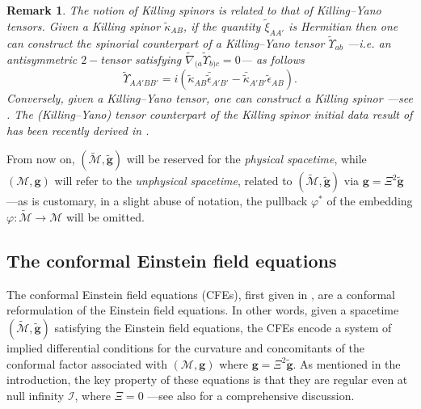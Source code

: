 \documentclass[10pt,a4paper]{article}
\theoremstyle{plain}
\newtheorem{remark}{Remark}
\def\bmg{{\bm g}}
\begin{document}
\begin{remark}
  \emph{ The notion of Killing spinors is related to that of
  Killing--Yano tensors. Given a Killing spinor $\tilde{\kappa}_{AB}$, if the quantity $\tilde{\xi}_{AA'}$ is
  Hermitian
  then
  one can construct the spinorial counterpart of a \emph{Killing--Yano
  tensor} $\tilde{\Upsilon}_{ab}$ ---i.e. an antisymmetric $2-$tensor
  satisfying $\tilde{\nabla}_{(a}\tilde{\Upsilon}_{b)c}=0$--- as
  follows
\[\tilde{\Upsilon}_{AA'BB'}=i(\tilde{\kappa}_{AB}\bar{\tilde{\epsilon}}_{A'B'}
-\bar{\tilde{\kappa}}_{A'B'}\tilde{\epsilon}_{AB}).\] 
Conversely,
given a Killing--Yano tensor, one can construct a Killing spinor
---see \cite{ValCol16,McLBer93,PenRin86}.  The (Killing--Yano) tensor
counterpart of the Killing spinor initial data result of \cite{GarVal08c}
has been recently derived in \cite{GarKha19a}.  }
\end{remark}
From now on, $(\tilde{\mathcal{M}},\tilde{\bmg})$ will be reserved for the \emph{physical spacetime},
while $(\mathcal{M},\bmg)$ will refer to the \emph{unphysical spacetime}, related to
$(\tilde{\mathcal{M}},\tilde{\bmg})$ via $\bmg=\Xi^2\tilde{\bmg}$ ---as is customary, in a slight abuse of notation, the pullback $\varphi^*$ of the
 embedding $\varphi:
\tilde{\mathcal{M}}\rightarrow\mathcal{M}$ will be omitted.



\subsection{The conformal Einstein field equations}
\label{Sec:CFEs}

 

The conformal Einstein field equations (CFEs), first given in \cite{Fri81a}, are a conformal
reformulation of the Einstein field equations. In other words, given a
spacetime $(\tilde{\mathcal{M}},\tilde{\bmg})$ satisfying the Einstein
field equations, the CFEs encode a system of implied differential conditions for the curvature and
concomitants of the conformal factor associated with
$(\mathcal{M},\bmg)$ where $\bmg=\Xi^2\tilde{\bmg}$. As mentioned in the introduction, the key property
of these equations is that they are regular even at null infinity
$\mathscr{I}$, where $\Xi=0$ ---see also \cite{CFEbook} for a
comprehensive discussion.


\medskip
\end{document}
